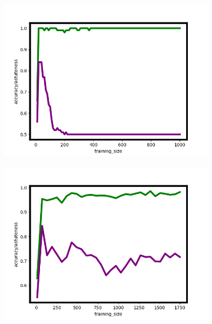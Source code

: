 \begin{figure}
\begin{subfigure}{0.31\textwidth}
\includegraphics[width=\linewidth]{hist_noiseless_final}
\end{subfigure}\hspace*{\fill}
\begin{subfigure}{0.31\textwidth}
\includegraphics[width=\linewidth]{hist_noisy_final}
\end{subfigure}\hspace*{\fill}
\begin{subfigure}{0.31\textwidth}

\end{subfigure}
\end{figure}

